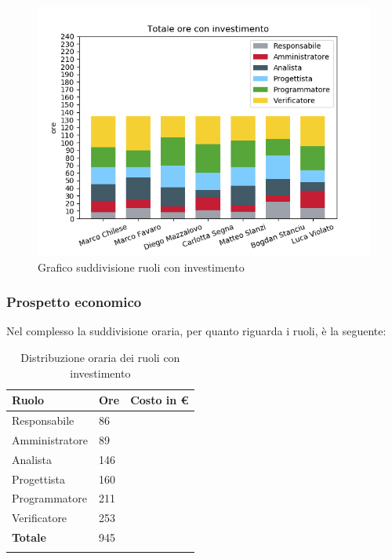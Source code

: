 \begin{figure}[H]
	\centering
  		\includegraphics[width=1\linewidth]{./images/fig_toi.png}
  		\caption{Grafico suddivisione ruoli con investimento}
  		\label{fig:grafico suddivione ruoli con investimento}
\end{figure}

\subsubsection{Prospetto economico}
Nel complesso la suddivisione oraria, per quanto riguarda i ruoli, è la seguente: 


\begin{longtable}{| C{.30\textwidth}| C{.15\textwidth}| C{.20\textwidth}|}
\hline
\textbf{Ruolo} & \textbf{Ore} & \textbf{Costo in \euro} \\
\hline 
Responsabile & 86 & \\
\hline
Amministratore & 89 &  \\
\hline
Analista & 146 &  \\
\hline 
Progettista & 160 & \\
\hline
Programmatore & 211 &  \\
\hline
Verificatore & 253 &  \\
\hline
\textbf{Totale} & 945 &  \\
\hline
\caption{Distribuzione oraria dei ruoli con investimento}
\label{Distribuzione oraria ruoli con investimento}
\end{longtable}

